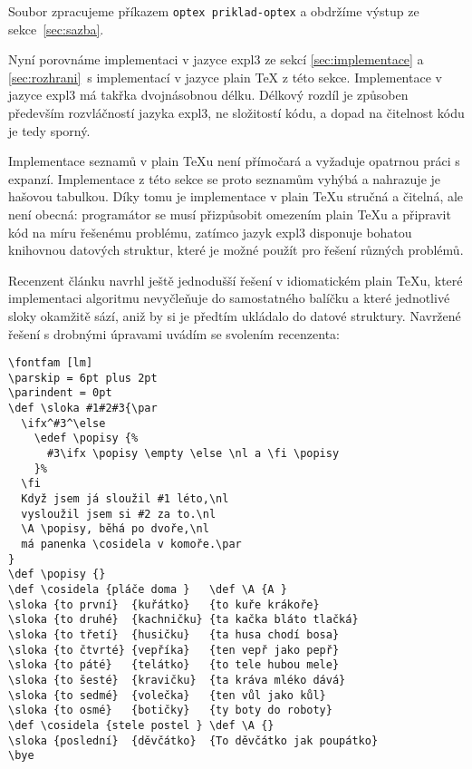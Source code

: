 \documentclass{csbulletin}
\newenvironment{mintedblock}{%
  \par\vspace{\topsep}\vspace{\partopsep}%
  \begingroup
  \fvset{listparameters=\setlength{\topsep}{0pt}\setlength{\partopsep}{0pt}}%
}{%
  \endgroup
  \par\vspace{\topsep}\vspace{\partopsep}%
}
\begin{document}
\begin{mintedblock}
\inputminted[firstnumber=1]{tex}{example-optex.tex}
\end{mintedblock}

\noindent
Soubor zpracujeme příkazem \texttt{optex priklad-optex} a obdržíme výstup ze sekce~\ref{sec:sazba}.

Nyní porovnáme implementaci v jazyce expl3 ze sekcí \ref{sec:implementace} a \ref{sec:rozhrani}\, s implementací v jazyce plain \TeX{} z této sekce. Implementace v jazyce expl3 má takřka dvojnásobnou délku. Délkový rozdíl je způsoben především rozvláčností jazyka expl3, ne složitostí kódu, a dopad na čitelnost kódu je tedy sporný.

Implementace seznamů v plain \TeX u není přímočará a vyžaduje opatrnou práci s expanzí. Implementace z této sekce se proto seznamům vyhýbá a nahrazuje je hašovou tabulkou. Díky tomu je implementace v plain \TeX u stručná a čitelná, ale není obecná: programátor se musí přizpůsobit omezením plain \TeX u a připravit kód na míru řešenému problému, zatímco jazyk expl3 disponuje bohatou knihovnou datových struktur, které je možné použít pro řešení různých problémů.

Recenzent článku navrhl ještě jednodušší řešení v idiomatickém plain \TeX u, které implementaci algoritmu nevyčleňuje do samostatného balíčku a které jednotlivé sloky okamžitě sází, aniž by si je předtím ukládalo do datové struktury. Navržené řešení s drobnými úpravami uvádím se svolením recenzenta:

\begin{mintedblock}
\begin{verbatim}
\fontfam [lm]
\parskip = 6pt plus 2pt
\parindent = 0pt
\def \sloka #1#2#3{\par
  \ifx^#3^\else
    \edef \popisy {%
      #3\ifx \popisy \empty \else \nl a \fi \popisy
    }%
  \fi
  Když jsem já sloužil #1 léto,\nl
  vysloužil jsem si #2 za to.\nl
  \A \popisy, běhá po dvoře,\nl
  má panenka \cosidela v komoře.\par
}
\def \popisy {}
\def \cosidela {pláče doma }   \def \A {A }
\sloka {to první}  {kuřátko}   {to kuře krákoře}
\sloka {to druhé}  {kachničku} {ta kačka bláto tlačká}
\sloka {to třetí}  {husičku}   {ta husa chodí bosa}
\sloka {to čtvrté} {vepříka}   {ten vepř jako pepř}
\sloka {to páté}   {telátko}   {to tele hubou mele}
\sloka {to šesté}  {kravičku}  {ta kráva mléko dává}
\sloka {to sedmé}  {volečka}   {ten vůl jako kůl}
\sloka {to osmé}   {botičky}   {ty boty do roboty}
\def \cosidela {stele postel } \def \A {}
\sloka {poslední}  {děvčátko}  {To děvčátko jak poupátko}
\bye
\end{verbatim}
\end{mintedblock}
\end{document}
